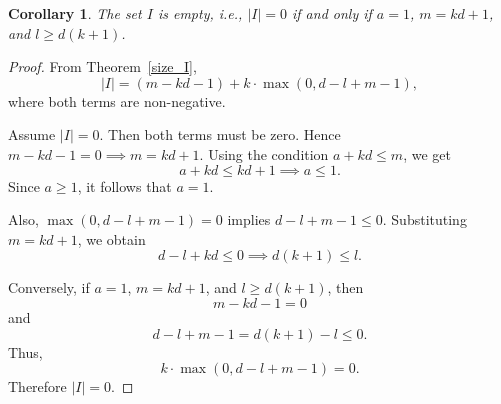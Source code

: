 \documentclass[12pt, english, a4paper]{article}
\theoremstyle{plain}
\newtheorem{corollary}[theorem]{Corollary}
\theoremstyle{definition}
\theoremstyle{remark}
\begin{document}
\begin{corollary}
The set $I$ is empty, i.e., $|I|=0$ if and only if 
$a=1$, $m=kd+1$, and $l\ge d(k+1)$.
\end{corollary}

\begin{proof}
From Theorem~\ref{size_I},
$$
|I|=(m-kd-1)+k\cdot \max(0,d-l+m-1),
$$
where both terms are non-negative.

Assume $|I|=0$. Then both terms must be zero. Hence
$
m-kd-1=0 \implies m=kd+1.
$
Using the condition $a+kd\le m$, we get
\[
a+kd\le kd+1 \implies a\le 1.
\]
Since $a\ge 1$, it follows that $a=1$.

Also,
$
\max(0,d-l+m-1)=0
$ implies
$
d-l+m-1\le 0.
$
Substituting $m=kd+1$, we obtain
\[
d-l+kd\le 0
\implies d(k+1)\le l.
\]

Conversely, if $a=1$, $m=kd+1$, and $l\ge d(k+1)$, then
\[
m-kd-1=0
\]
and
\[
d-l+m-1=d(k+1)-l\le 0.
\]
Thus,
\[
k\cdot \max(0,d-l+m-1)=0.
\]
Therefore $|I|=0$.
\end{proof}






\end{document}

